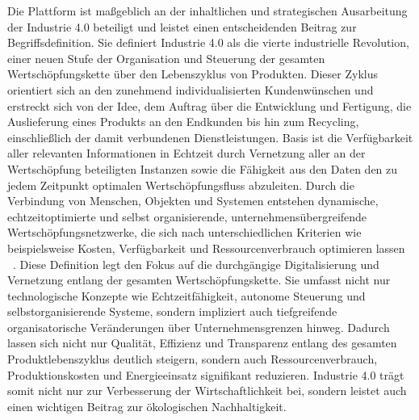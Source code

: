 Die Plattform ist maßgeblich an der inhaltlichen und strategischen Ausarbeitung der Industrie 4.0 beteiligt und leistet einen entscheidenden Beitrag zur Begriffsdefinition. 
Sie definiert Industrie 4.0 als
\glqq die vierte industrielle Revolution, einer neuen Stufe der Organisation und Steuerung der gesamten Wertschöpfungskette über den Lebenszyklus von Produkten.
Dieser Zyklus orientiert sich an den zunehmend individualisierten Kundenwünschen und erstreckt sich von der Idee, dem Auftrag über die Entwicklung und Fertigung, die Auslieferung eines Produkts an den Endkunden bis hin zum Recycling, einschließlich der damit verbundenen Dienstleistungen.
Basis ist die Verfügbarkeit aller relevanten Informationen in Echtzeit durch Vernetzung aller an der Wertschöpfung beteiligten Instanzen sowie die Fähigkeit aus den Daten den zu jedem Zeitpunkt optimalen Wertschöpfungsfluss abzuleiten. 
Durch die Verbindung von Menschen, Objekten und Systemen entstehen dynamische, echtzeitoptimierte und selbst organisierende, unternehmensübergreifende Wertschöpfungsnetzwerke, die sich nach unterschiedlichen Kriterien wie beispielsweise Kosten, Verfügbarkeit und Ressourcenverbrauch optimieren lassen \grqq~\cite[S. 8]{plattform_i40_definition}.
Diese Definition legt den Fokus auf die durchgängige Digitalisierung und Vernetzung entlang der gesamten Wertschöpfungskette. 
Sie umfasst nicht nur technologische Konzepte wie Echtzeitfähigkeit, autonome Steuerung und selbstorganisierende Systeme, sondern impliziert auch tiefgreifende organisatorische Veränderungen über Unternehmensgrenzen hinweg. 
Dadurch lassen sich nicht nur Qualität, Effizienz und Transparenz entlang des gesamten Produktlebenszyklus deutlich steigern, sondern auch Ressourcenverbrauch, Produktionskosten und Energieeinsatz signifikant reduzieren. 
Industrie 4.0 trägt somit nicht nur zur Verbesserung der Wirtschaftlichkeit bei, sondern leistet auch einen wichtigen Beitrag zur ökologischen Nachhaltigkeit.



